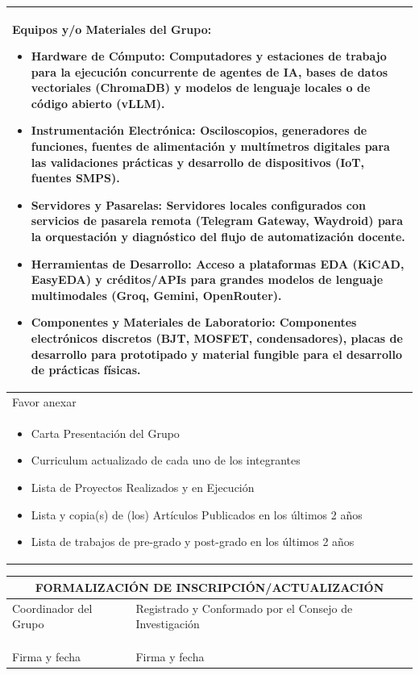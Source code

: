 \documentclass[12pt, a4paper]{article}
\begin{document}
\noindent
\begin{tabularx}{\textwidth}{|X|}
\hline
\textbf{Equipos y/o Materiales del Grupo:}\vspace{0.2cm}
\begin{itemize}\small
    \item \textbf{Hardware de Cómputo:} Computadores y estaciones de trabajo para la ejecución concurrente de agentes de IA, bases de datos vectoriales (ChromaDB) y modelos de lenguaje locales o de código abierto (vLLM).
    \item \textbf{Instrumentación Electrónica:} Osciloscopios, generadores de funciones, fuentes de alimentación y multímetros digitales para las validaciones prácticas y desarrollo de dispositivos (IoT, fuentes SMPS).
    \item \textbf{Servidores y Pasarelas:} Servidores locales configurados con servicios de pasarela remota (Telegram Gateway, Waydroid) para la orquestación y diagnóstico del flujo de automatización docente.
    \item \textbf{Herramientas de Desarrollo:} Acceso a plataformas EDA (KiCAD, EasyEDA) y créditos/APIs para grandes modelos de lenguaje multimodales (Groq, Gemini, OpenRouter).
    \item \textbf{Componentes y Materiales de Laboratorio:} Componentes electrónicos discretos (BJT, MOSFET, condensadores), placas de desarrollo para prototipado y material fungible para el desarrollo de prácticas físicas.
\end{itemize}
\vspace{6cm} \\
\hline
Favor anexar\\
\begin{itemize}
    \item Carta Presentación del Grupo
    \item Curriculum actualizado de cada uno de los integrantes
    \item Lista de Proyectos Realizados y en Ejecución
    \item Lista y copia(s) de (los) Artículos Publicados en los últimos 2 años
    \item Lista de trabajos de pre-grado y post-grado en los últimos 2 años
\end{itemize}\\
\hline
\end{tabularx}

\vspace{0.5cm}

\noindent
\begin{tabularx}{\textwidth}{|X|X|}
\hline
\multicolumn{2}{|c|}{\cellcolor[gray]{0.9}\textbf{FORMALIZACIÓN DE INSCRIPCIÓN/ACTUALIZACIÓN}} \\
\hline
Coordinador del Grupo & Registrado y Conformado por el Consejo de Investigación \\
\hline
 & \\
 & \\
 & \\
Firma y fecha & Firma y fecha \\
\hline
\end{tabularx}
\end{document}
